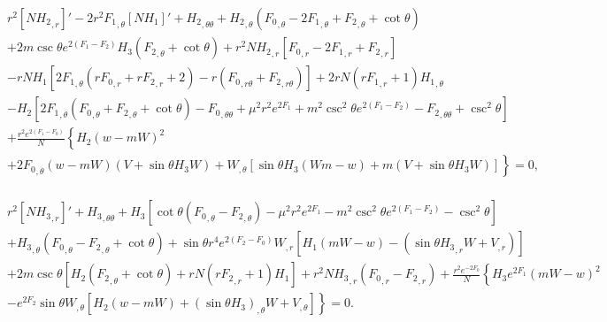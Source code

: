 
\begin{eqnarray}   
&& 
r^2 [N {H_2}_{,r}]'
-2 r^2 {F_1}_{,\theta} [N{H_1}]'
+{H_2}_{,\theta\theta}
+ {H_2}_{,\theta} \left({F_0}_{,\theta}-2 {F_1}_{,\theta}+{F_2}_{,\theta}+\cot\theta\right)
\nonumber \\
%
&&
+2 {m} \csc \theta e^{2 ({F_1}-F_2)} {H_3} \left({F_2}_{,\theta}
+\cot \theta\right) 
+r^2 N {H_2}_{,r} \left[{F_0}_{,r} 
-2 {F_1}_{,r} 
+{F_2}_{,r} \right]
\nonumber \\
%
&&
-rN{H_1} \left[2 {F_1}_{,\theta} \left(r {F_0}_{,r}+r {F_2}_{,r}+2\right) 
-r \left({F_0}_{,r\theta}+{F_2}_{,r\theta}\right)\right]
+2rN \left(r {F_1}_{,r}+1\right) {H_1}_{,\theta}
\nonumber \\
%
&&
- H_2 \left[2 {F_1}_{,\theta} 
\left({F_0}_{,\theta}+{F_2}_{,\theta}+\cot \theta\right)
-{F_0}_{,\theta\theta} +{\mu^2} r^2 e^{2 
{F_1}}+{m}^2 \csc ^2\theta e^{2( 
{F_1}-F_2)}- {F_2}_{,\theta\theta}+\csc ^2\theta \right] \nonumber \\
%
&&
+\frac{r^2 e^{2 ({F_1}-F_0)} }{N}
\left\{ {H_2} (w-{m} W)^2 
 \right. \nonumber \\
%
&&
\left.
+2{F_0}_{,\theta}(w-mW)(V+\sin\theta H_3W)+W_{,\theta}[\sin \theta {H_3}(Wm-w)+m(V+\sin \theta {H_3}W)]\right\} =0,  \nonumber \\
&&
\end{eqnarray}




\begin{eqnarray}
&&
r^2 [N  {H_3}_{,r}]'
+{H_3}_{,\theta\theta}+ {H_3} 
 \left[
  \cot \theta ({F_0}_{,\theta} -{F_2}_{,\theta})
 - {\mu^2} r^2 e^{2 {F_1}}
 - {m}^2 \csc ^2\theta e^{2( 
{F_1}-F_2)}
-\csc ^2\theta 
\right] 
  \nonumber \\
%
&&
+{H_3}_{,\theta} \left({F_0}_{,\theta}-{F_2}_{,\theta}+\cot \theta\right)
+\sin\theta r^4e^{2 ({F_2}-F_0)}W_{,r}[
   {H_1}(m W 
- w)   
-( \sin \theta  {H_3}_{,r} W 
+ V_{,r}) ]
  \nonumber \\
%
&&
+2 {m} \csc \theta [
{H_2} 
\left({F_2}_{,\theta}+\cot \theta\right) 
+ rN 
\left(r {F_2}_{,r}+1\right) {H_1}]
+ r^2N{H_3}_{,r} \left({F_0}_{,r} 
-{F_2}_{,r}\right)
+\frac{ r^2e^{-2F_0} }{N} 
\left\{
{H_3}e^{2 {F_1}} \left({m}  W-w \right)^2 
 \right. \nonumber \\
%
&&
\left.
- e^{2 {F_2}}\sin\theta W_{,\theta} [
 {H_2} (w-{m} W)+(\sin \theta
{H_3})_{,\theta} W+V_{,\theta}]\right\}=0 .
\nonumber \\
&&
\end{eqnarray}

